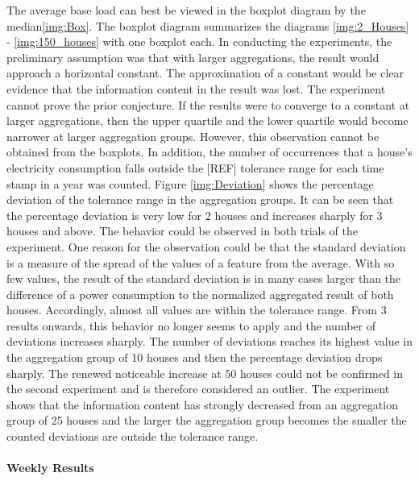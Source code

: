 The average base load can best be viewed in the boxplot diagram by the median\ref{img:Box}. The boxplot diagram summarizes the diagrams \ref{img:2_Houses} - \ref{img:150_houses} with one boxplot each. In conducting the experiments, the preliminary assumption was that with larger aggregations, the result would approach a horizontal constant. The approximation of a constant would be clear evidence that the information content in the result was lost. The experiment cannot prove the prior conjecture. If the results were to converge to a constant at larger aggregations, then the upper quartile and the lower quartile would become narrower at larger aggregation groups. However, this observation cannot be obtained from the boxplots. 
In addition, the number of occurrences that a house's electricity consumption falls outside the [REF] tolerance range for each time stamp in a year was counted. Figure \ref{img:Deviation} shows the percentage deviation of the tolerance range in the aggregation groups. It can be seen that the percentage deviation is very low for 2 houses and increases sharply for 3 houses and above. The behavior could be observed in both trials of the experiment. One reason for the observation could be that the standard deviation is a measure of the spread of the values of a feature from the average. With so few values, the result of the standard deviation is in many cases larger than the difference of a power consumption to the normalized aggregated result of both houses. Accordingly, almost all values are within the tolerance range. From 3 results onwards, this behavior no longer seems to apply and the number of deviations increases sharply. The number of deviations reaches its highest value in the aggregation group of 10 houses and then the percentage deviation drops sharply. The renewed noticeable increase at 50 houses could not be confirmed in the second experiment and is therefore considered an outlier. The experiment shows that the information content has strongly decreased from an aggregation group of 25 houses and the larger the aggregation group becomes the smaller the counted deviations are outside the tolerance range.
\\
\\
\textbf{Weekly Results}
\\
\\
